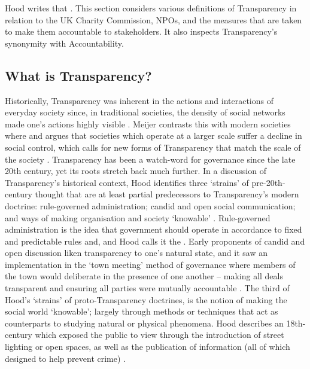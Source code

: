 %
Hood writes that  \cite{hood_transparency_2006-1}. This section considers various definitions of Transparency in relation to the UK Charity Commission, NPOs, and the measures that are taken to make them accountable to stakeholders. It also inspects Transparency's synonymity with Accountability.

\subsection{What is Transparency?}
Historically, Transparency was inherent in the actions and interactions of everyday society since, in traditional societies, the density of social networks made one's actions highly visible \cite{meijer_understanding_2009}. Meijer contrasts this with modern societies where  and argues that societies which operate at a larger scale suffer a decline in social control, which calls for new forms of Transparency that match the scale of the society \cite{meijer_understanding_2009}.
%
Transparency has been a watch-word for governance since the late 20th century, yet its roots stretch back much further. In a discussion of Transparency's historical context, Hood identifies three `strains' of pre-20th-century thought that are at least partial predecessors to Transparency's modern doctrine: rule-governed administration; candid and open social communication; and ways of making organisation and society `knowable'  \cite{hood_transparency_2006-1}.
%
Rule-governed administration is the idea that government should operate in accordance to fixed and predictable rules and, and Hood calls it the  \cite{hood_transparency_2006-1}. Early proponents of candid and open discussion liken transparency to one's natural state, and it saw an implementation in the `town meeting' method of governance where members of the town would deliberate in the presence of one another -- making all deals transparent and ensuring all parties were mutually accountable \cite{hood_transparency_2006-1}. The third of Hood's `strains' of proto-Transparency doctrines, is the notion of making the social world `knowable'; largely through methods or techniques that act as counterparts to studying natural or physical phenomena. Hood describes an 18th-century  which exposed the public to view through the introduction of street lighting or open spaces, as well as the publication of information (all of which designed to help prevent crime) \cite{hood_transparency_2006-1}.

